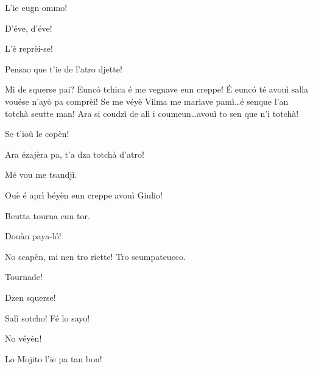\begin{drama}

\Giuliospeaks L'ie eugn ommo!


\Helenespeaks{} D'éve, d'éve!


\Marcospeaks L'è reprèi-se!

\Michelspeaks{} Pensao que t'ie de l'atro djette!

\Giuliospeaks Mi de squerse pai? Eunc\'o tchica é me vegnave eun creppe! \'E eunc\'o té avouì salla vouése n'ayò pa comprèi! Se me véyè Vilma me mariave pamì\ldots é senque l'an totchà seutte man!  Ara si coudzì de alì i coumeun\ldots avouì to sen que n'i totchà!

\Marcospeaks Se t'ioù le copèn!

\Michelspeaks Ara ézajèra pa, t'a dza totchà d'atro!


\Samispeaks Mé vou me tsandjì.

\Michelspeaks Ouè é aprì béyèn eun creppe avouì Giulio!


\Michelspeaks{} Beutta tourna eun tor.

\Bertaspeaks Douàn paya-l\'o!


\Louisspeaks{} No scapèn, mi nen tro riette! Tro seumpateucco.

\Michelspeaks Tournade!

\Pierrespeaks{} Dzen squerse!

\Michelspeaks Salì sotcho! Fé lo sayo!

\Louisspeaks No véyèn!

\Pierrespeaks{} Lo Mojito l'ie pa tan bon!



\end{drama}
